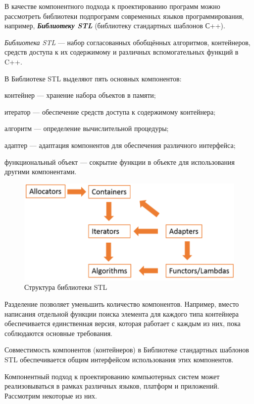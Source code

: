 В качестве компонентного подхода к проектированию программ можно рассмотреть библиотеки подпрограмм современных языков программирования, например, \textbf{\textit{Библиотеку STL}} (библиотеку стандартных шаблонов С++).

\textit{Библиотека STL} --- набор согласованных обобщённых алгоритмов, контейнеров, средств доступа к их содержимому и различных вспомогательных функций в C++.

В Библиотеке STL выделяют пять основных компонентов:
\begin{textitemize}
	\item контейнер --- хранение набора объектов в памяти;
	\item итератор --- обеспечение средств доступа к содержимому контейнера;
	\item алгоритм --- определение вычислительной процедуры;
	\item адаптер --- адаптация компонентов для обеспечения различного интерфейса;
	\item функциональный объект --- сокрытие функции в объекте для использования другими компонентами.
\end{textitemize}

\begin{figure}[H]
	\includegraphics[scale=0.7]{author/part5/figures/STL.png}
	\caption{Структура библиотеки STL}
	\label{fig:STL}
\end{figure}

Разделение позволяет уменьшить количество компонентов. Например, вместо написания отдельной функции поиска элемента для каждого типа контейнера обеспечивается единственная версия, которая работает с каждым из них, пока соблюдаются основные требования.

Совместимость компонентов (контейнеров) в Библиотеке стандартных шаблонов STL обеспечивается общим интерфейсом использования этих компонентов.

Компонентный подход к проектированию компьютерных систем может реализовываться в рамках различных языков, платформ и приложений. Рассмотрим некоторые из них.

